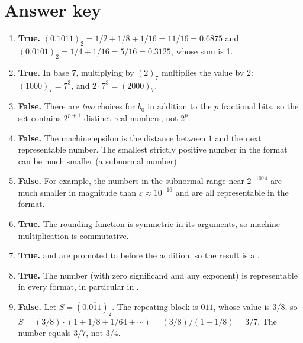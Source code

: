 \documentclass[a4paper]{article}
\begin{document}
\section*{Answer key}
\begin{enumerate}[itemsep=8pt]
    \item \textbf{True.}
        $(0.1011)_2 = 1/2 + 1/8 + 1/16 = 11/16 = 0.6875$ and
        $(0.0101)_2 = 1/4 + 1/16 = 5/16 = 0.3125$, whose sum is 1.

    \item \textbf{True.}
        In base 7, multiplying by $(2)_7$ multiplies the value by 2:
        $(1000)_7 = 7^3$, and $2 \cdot 7^3 = (2000)_7$.

    \item \textbf{False.}
        There are \emph{two} choices for $b_0$ in addition to the
        $p$ fractional bits, so the set contains $2^{p+1}$ distinct real
        numbers, not $2^p$.

    \item \textbf{False.}
        The machine epsilon is the distance between $1$ and the next
        representable number. The smallest strictly positive number in the
        format can be much smaller (a subnormal number).

    \item \textbf{False.}
        For example, the numbers in the subnormal range near $2^{-1074}$
        are much smaller in magnitude than $\varepsilon \approx 10^{-16}$
        and are all representable in the  format.

    \item \textbf{True.}
        The rounding function is symmetric in its arguments, so machine
        multiplication is commutative.

    \item \textbf{True.}
         and  are promoted to
         before the addition, so the result is a
        .

    \item \textbf{True.}
        The number  (with zero significand and any exponent) is
        representable in every format, in particular in .

    \item \textbf{False.}
        Let $S = (0.\overline{011})_2$. The repeating block is $011$,
        whose value is $3/8$, so
        $S = (3/8) \cdot (1 + 1/8 + 1/64 + \dotsb) = (3/8)/(1 - 1/8) = 3/7$.
        The number equals $3/7$, not $3/4$.


\end{enumerate}
\end{document}
